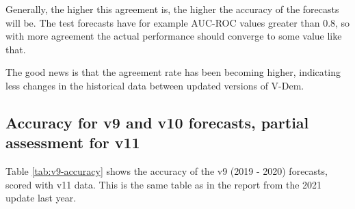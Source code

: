 \documentclass[
  11pt,
]{article}
\begin{document}
Generally, the higher this agreement is, the higher the accuracy of the
forecasts will be. The test forecasts have for example AUC-ROC values
greater than 0.8, so with more agreement the actual performance should
converge to some value like that.

The good news is that the agreement rate has been becoming higher,
indicating less changes in the historical data between updated versions
of V-Dem.

\hypertarget{accuracy-for-v9-and-v10-forecasts-partial-assessment-for-v11}{%
\subsection{Accuracy for v9 and v10 forecasts, partial assessment for
v11}\label{accuracy-for-v9-and-v10-forecasts-partial-assessment-for-v11}}

Table \ref{tab:v9-accuracy} shows the accuracy of the v9 (2019 - 2020)
forecasts, scored with v11 data. This is the same table as in the report
from the 2021 update last year.
\end{document}
